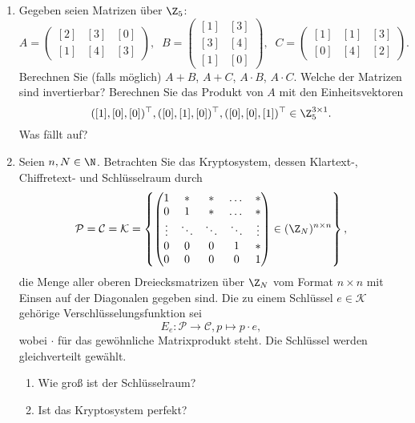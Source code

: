 \documentclass[german]{mhexsheet}
\newcommand{\mc}{\mathcal}
\begin{document}
\begin{exercise}
\begin{enumerate}
 \item Gegeben seien Matrizen über $\Z_5$: 
 \[A = \begin{pmatrix}
        [2] & [3] & [0] \\
        [1] & [4] & [3]
       \end{pmatrix}, \;\; B = 
       \begin{pmatrix}
       [1] & [3] \\
       [3] & [4] \\
       [1] & [0] 
       \end{pmatrix}, \;\; C =
       \begin{pmatrix}
        [1] & [1] & [3] \\
        [0] & [4] & [2]
       \end{pmatrix}
.\]
 Berechnen Sie (falls möglich) $A + B$, $A + C$, $A \cdot B$, $A \cdot C$. Welche der Matrizen sind invertierbar? Berechnen Sie das Produkt von $A$ mit den Einheitsvektoren 
 \[([1], [0], [0])^{\top}, ([0], [1], [0])^{\top}, ([0], [0], [1])^{\top} \in \Z_5^{3 \times 1}.\]
 Was fällt auf?

\item  Seien $n, N \in \N$. Betrachten Sie das Kryptosystem, dessen Klartext-, Chiffretext- und Schlüsselraum durch 
 \[\mc P = \mc C = \mc K = \left\{\begin{pmatrix} 1 & * & * & \dotsc & * \\
                                   0 & 1 & * & \dotsc & * \\
                                   \vdots & \ddots & \ddots & \ddots & \vdots \\
                                   0 & 0 & 0 & 1&  * \\
                                   0 & 0 & 0 & 0 & 1 
                                  \end{pmatrix} \in (\Z_N)^{n \times n}\right\},\]
die Menge aller oberen Dreiecksmatrizen über $\Z_N$ vom Format $n \times n$ mit Einsen auf der Diagonalen gegeben sind. Die zu einem Schlüssel $e \in \mc K$ gehörige Verschlüsselungsfunktion sei
\[E_{e}: \mc P \rightarrow \mc C, p \mapsto p \cdot e,\]
wobei $\cdot$ für das gewöhnliche Matrixprodukt steht. Die Schlüssel werden gleichverteilt gewählt.
\begin{enumerate}
 \item Wie groß ist der Schlüsselraum?
 \item Ist das Kryptosystem perfekt?
 \end{enumerate}
 \end{enumerate}
\end{exercise}
\end{document}
